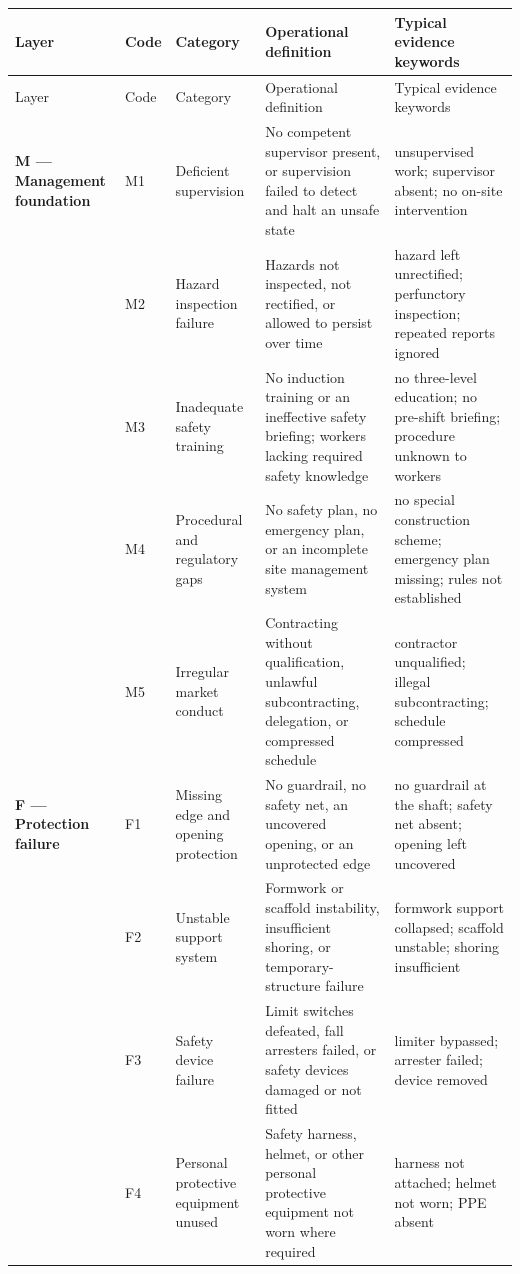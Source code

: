 \documentclass[11pt]{article}
\begin{document}
\begingroup\setlength{\tabcolsep}{2pt}\small
\begin{longtable}{>{\raggedright\arraybackslash}p{}>{\raggedright\arraybackslash}p{}>{\raggedright\arraybackslash}p{}>{\raggedright\arraybackslash}p{}>{\raggedright\arraybackslash}p{}}
\hline
Layer & Code & Category & Operational definition & Typical evidence keywords \\
\hline\endfirsthead
\hline
Layer & Code & Category & Operational definition & Typical evidence keywords \\
\hline\endhead
\textbf{M --- Management foundation} & M1 & Deficient supervision & No competent supervisor present, or supervision failed to detect and halt an unsafe state & unsupervised work; supervisor absent; no on-site intervention \\
 & M2 & Hazard inspection failure & Hazards not inspected, not rectified, or allowed to persist over time & hazard left unrectified; perfunctory inspection; repeated reports ignored \\
 & M3 & Inadequate safety training & No induction training or an ineffective safety briefing; workers lacking required safety knowledge & no three-level education; no pre-shift briefing; procedure unknown to workers \\
 & M4 & Procedural and regulatory gaps & No safety plan, no emergency plan, or an incomplete site management system & no special construction scheme; emergency plan missing; rules not established \\
 & M5 & Irregular market conduct & Contracting without qualification, unlawful subcontracting, delegation, or compressed schedule & contractor unqualified; illegal subcontracting; schedule compressed \\
\textbf{F --- Protection failure} & F1 & Missing edge and opening protection & No guardrail, no safety net, an uncovered opening, or an unprotected edge & no guardrail at the shaft; safety net absent; opening left uncovered \\
 & F2 & Unstable support system & Formwork or scaffold instability, insufficient shoring, or temporary-structure failure & formwork support collapsed; scaffold unstable; shoring insufficient \\
 & F3 & Safety device failure & Limit switches defeated, fall arresters failed, or safety devices damaged or not fitted & limiter bypassed; arrester failed; device removed \\
 & F4 & Personal protective equipment unused & Safety harness, helmet, or other personal protective equipment not worn where required & harness not attached; helmet not worn; PPE absent \\

\end{longtable}
\end{document}
